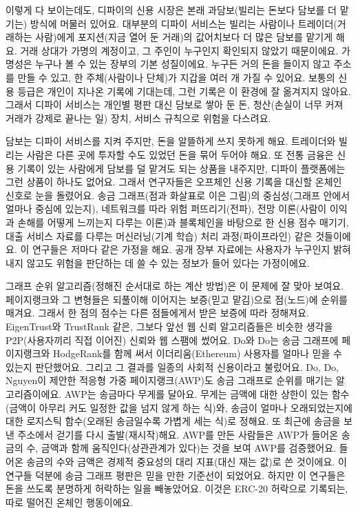 이렇게 다 보이는데도, 디파이의 신용 시장은 본래 과담보(빌리는 돈보다 담보를 더 맡기는) 방식에 머물러 있어요. 대부분의 디파이 서비스는 빌리는 사람이나 트레이더(거래하는 사람)에게 포지션(지금 열어 둔 거래)의 값어치보다 더 많은 담보를 맡기게 해요. 거래 상대가 가명의 계정이고, 그 주인이 누구인지 확인되지 않았기 때문이에요. 가명성은 누구나 볼 수 있는 장부의 기본 성질이에요. 누구든 거의 돈을 들이지 않고 주소를 만들 수 있고, 한 주체(사람이나 단체)가 지갑을 여러 개 가질 수 있어요. 보통의 신용 등급은 개인이 지나온 기록에 기대는데, 그런 기록은 이 환경에 잘 옮겨지지 않아요. 그래서 디파이 서비스는 개인별 평판 대신 담보로 쌓아 둔 돈, 청산(손실이 너무 커져 거래가 강제로 끝나는 일) 장치, 서비스 규칙으로 위험을 다스려요.

담보는 디파이 서비스를 지켜 주지만, 돈을 알뜰하게 쓰지 못하게 해요. 트레이더와 빌리는 사람은 다른 곳에 투자할 수도 있었던 돈을 묶어 두어야 해요. 또 전통 금융은 신용 기록이 있는 사람에게 담보를 덜 맡겨도 되는 상품을 내주지만, 디파이 플랫폼에는 그런 상품이 하나도 없어요. 그래서 연구자들은 오프체인 신용 기록을 대신할 온체인 신호로 눈을 돌렸어요. 송금 그래프(점과 화살표로 이은 그림)의 중심성(그래프 안에서 얼마나 중심에 있는지), 네트워크를 따라 위험 퍼뜨리기(전파), 전망 이론(사람이 이익과 손해를 어떻게 느끼는지 다루는 이론)과 블록체인을 바탕으로 한 신용 점수 매기기, 대출 서비스 자료를 다루는 머신러닝(기계 학습) 처리 과정(파이프라인) 같은 것들이에요. 이 연구들은 저마다 같은 가정을 해요. 공개 장부 자료에는 사용자가 누구인지 밝혀내지 않고도 위험을 판단하는 데 쓸 수 있는 정보가 들어 있다는 가정이에요.

그래프 순위 알고리즘(정해진 순서대로 하는 계산 방법)은 이 문제에 잘 맞아 보여요. 페이지랭크와 그 변형들은 되풀이해 이어지는 보증(믿고 맡김)으로 점(노드)에 순위를 매겨요. 그래서 한 점의 점수는 다른 점들에게서 받은 보증에 따라 정해져요. EigenTrust와 TrustRank 같은, 그보다 앞선 웹 신뢰 알고리즘들은 비슷한 생각을 P2P(사용자끼리 직접 이어진) 신뢰와 웹 스팸에 썼어요. Do와 Do는 송금 그래프에 페이지랭크와 HodgeRank를 함께 써서 이더리움(Ethereum) 사용자를 얼마나 믿을 수 있는지 판단했어요. 그리고 그 결과를 일종의 사회적 신용이라고 불렀어요. Do, Do, Nguyen이 제안한 적응형 가중 페이지랭크(AWP)도 송금 그래프로 순위를 매기는 알고리즘이에요. AWP는 송금마다 무게를 달아요. 무게는 금액에 대한 상한이 있는 함수(금액이 아무리 커도 일정한 값을 넘지 않게 하는 식)와, 송금이 얼마나 오래되었는지에 대한 로지스틱 함수(오래된 송금일수록 가볍게 세는 식)로 정해요. 또 최근에 송금을 보낸 주소에서 걷기를 다시 출발(재시작)해요. AWP를 만든 사람들은 AWP가 들어온 송금의 수, 금액과 함께 움직인다(상관관계가 있다)는 것을 보여 AWP를 검증했어요. 들어온 송금의 수와 금액은 경제적 중요성의 대리 지표(대신 재는 값)로 쓴 것이에요. 이 연구들 덕분에 송금 그래프 평판은 믿을 만한 기준선이 되었어요. 하지만 이 연구들은 돈을 쓰도록 분명하게 허락하는 일을 빼놓았어요. 이것은 ERC-20 허락으로 기록되는, 따로 떨어진 온체인 행동이에요.

